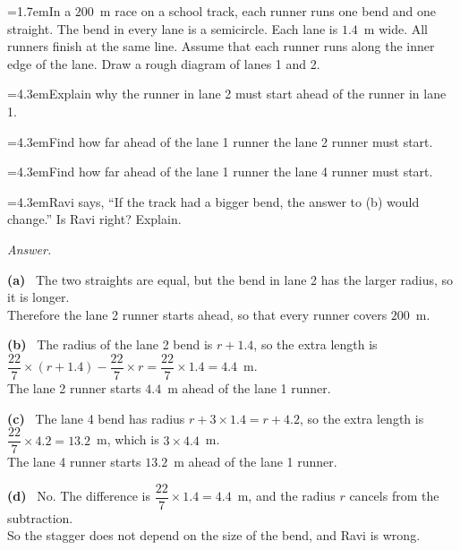 \documentclass[11pt,a4paper]{article}
\newcommand{\nl}{\\[3pt]}
\newcounter{qn}
\newcommand{\ques}{\par\medskip\refstepcounter{qn}\noindent\hangindent=1.7em\hangafter=1\makebox[1.7em][l]{\textbf{\arabic{qn}.}}\ignorespaces}
\newcommand{\pc}[2]{\par\smallskip\noindent\hspace*{2em}\hangindent=4.3em\hangafter=1\makebox[2em][l]{(#1)}\hspace{0.3em}#2\par}
\newenvironment{answerblock}
  {\par\needspace{6\baselineskip}\smallskip\begingroup\small\linespread{1.2}\selectfont\color{muted}\noindent\textit{Answer.}\par}
  {\par\endgroup\medskip}
\newcommand{\ap}[1]{\par\smallskip\noindent\textbf{(#1)}\ }
\begin{document}
\ques In a $200$~m race on a school track, each runner runs one bend and one straight. The bend in every lane is a semicircle. Each lane is $1.4$~m wide. All runners finish at the same line. Assume that each runner runs along the inner edge of the lane. Draw a rough diagram of lanes 1 and 2.\par
\pc{a}{Explain why the runner in lane 2 must start ahead of the runner in lane 1.}
\pc{b}{Find how far ahead of the lane 1 runner the lane 2 runner must start.}
\pc{c}{Find how far ahead of the lane 1 runner the lane 4 runner must start.}
\pc{d}{Ravi says, ``If the track had a bigger bend, the answer to (b) would change.'' Is Ravi right? Explain.}
\begin{answerblock}
\ap{a} The two straights are equal, but the bend in lane 2 has the larger radius, so it is longer.\nl
Therefore the lane 2 runner starts ahead, so that every runner covers $200$~m.\nl
\ap{b} The radius of the lane 2 bend is $r+1.4$, so the extra length is $\dfrac{22}{7}\times(r+1.4)-\dfrac{22}{7}\times r=\dfrac{22}{7}\times1.4=4.4$~m.\nl
The lane 2 runner starts $4.4$~m ahead of the lane 1 runner.\nl
\ap{c} The lane 4 bend has radius $r+3\times1.4=r+4.2$, so the extra length is $\dfrac{22}{7}\times4.2=13.2$~m, which is $3\times4.4$~m.\nl
The lane 4 runner starts $13.2$~m ahead of the lane 1 runner.\nl
\ap{d} No. The difference is $\dfrac{22}{7}\times1.4=4.4$~m, and the radius $r$ cancels from the subtraction.\nl
So the stagger does not depend on the size of the bend, and Ravi is wrong.
\begin{center}
\end{center}
\end{answerblock}
\end{document}
